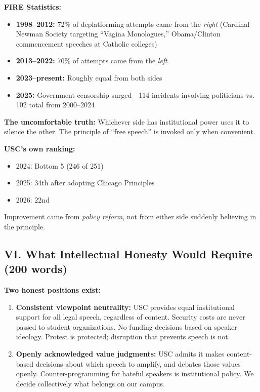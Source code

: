\documentclass[11pt,letterpaper]{article}
\begin{document}
\textbf{FIRE Statistics:}
\begin{itemize}[noitemsep]
    \item \textbf{1998--2012:} 72\% of deplatforming attempts came from the \textit{right} (Cardinal Newman Society targeting ``Vagina Monologues,'' Obama/Clinton commencement speeches at Catholic colleges)
    \item \textbf{2013--2022:} 70\% of attempts came from the \textit{left}
    \item \textbf{2023--present:} Roughly equal from both sides
    \item \textbf{2025:} Government censorship surged---114 incidents involving politicians vs. 102 total from 2000--2024
\end{itemize}

\textbf{The uncomfortable truth:} Whichever side has institutional power uses it to silence the other. The principle of ``free speech'' is invoked only when convenient.

\textbf{USC's own ranking:}
\begin{itemize}[noitemsep]
    \item 2024: Bottom 5 (246 of 251)
    \item 2025: 34th after adopting Chicago Principles
    \item 2026: 22nd
\end{itemize}

Improvement came from \textit{policy reform}, not from either side suddenly believing in the principle.

\subsection{VI. What Intellectual Honesty Would Require (200 words)}

\textbf{Two honest positions exist:}

\begin{enumerate}
    \item \textbf{Consistent viewpoint neutrality:} USC provides equal institutional support for all legal speech, regardless of content. Security costs are never passed to student organizations. No funding decisions based on speaker ideology. Protest is protected; disruption that prevents speech is not.

    \item \textbf{Openly acknowledged value judgments:} USC admits it makes content-based decisions about which speech to amplify, and debates those values openly. Counter-programming for hateful speakers is institutional policy. We decide collectively what belongs on our campus.
\end{enumerate}
\end{document}
